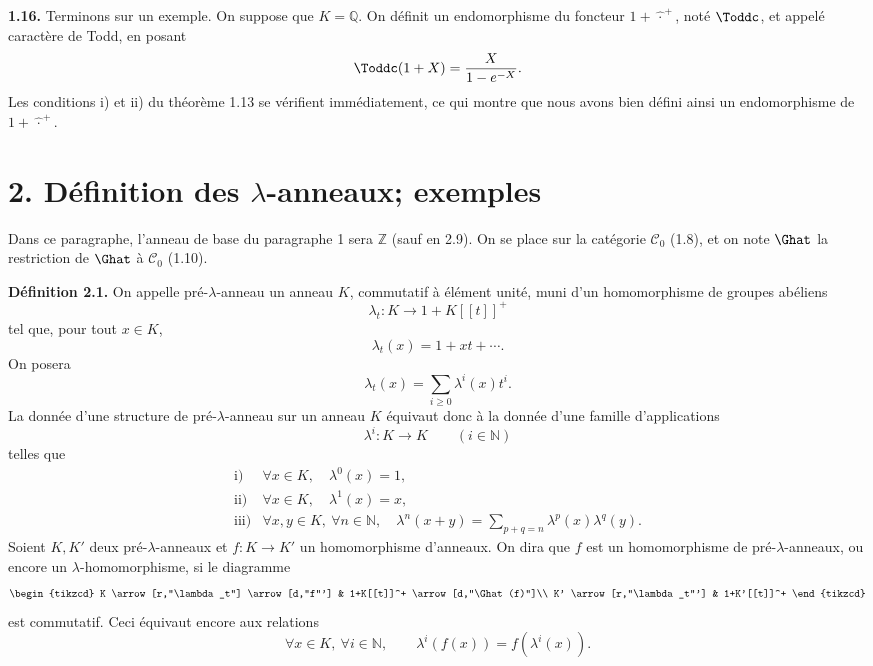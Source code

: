 \documentclass[11pt]{article}
\begin{document}
\textbf{1.16.} Terminons sur un exemple. On suppose que \(K=\mathbb Q\). On définit un endomorphisme du foncteur \(1+\widehat{\,\cdot\,}^{+}\), noté \(\Toddc\), et appelé caractère de Todd, en posant
\[
  \Toddc(1+X)=\frac{X}{1-e^{-X}}.
\]
Les conditions i) et ii) du théorème 1.13 se vérifient immédiatement, ce qui montre que nous avons bien défini ainsi un endomorphisme de \(1+\widehat{\,\cdot\,}^{+}\).

\section*{2. Définition des \(\lambda\)-anneaux; exemples}

Dans ce paragraphe, l'anneau de base du paragraphe 1 sera \(\mathbb Z\) (sauf en 2.9). On se place sur la catégorie \(\mathcal C_0\) (1.8), et on note \(\Ghat\) la restriction de \(\Ghat\) à \(\mathcal C_0\) (1.10).

\textbf{Définition 2.1.} On appelle pré-\(\lambda\)-anneau un anneau \(K\), commutatif à élément unité, muni d'un homomorphisme de groupes abéliens
\[
  \lambda_t:K\longrightarrow1+K[[t]]^+
\]
tel que, pour tout \(x\in K\),
\[
  \lambda_t(x)=1+xt+\cdots.
\]
On posera
\[
  \lambda_t(x)=\sum_{i\geq0}\lambda^i(x)t^i.
\]
La donnée d'une structure de pré-\(\lambda\)-anneau sur un anneau \(K\) équivaut donc à la donnée d'une famille d'applications
\[
  \lambda^i:K\longrightarrow K\qquad (i\in\mathbb N)
\]
telles que
\[
\begin{array}{ll}
\text{i)}& \forall x\in K,\quad \lambda^0(x)=1,\\[0.3em]
\text{ii)}& \forall x\in K,\quad \lambda^1(x)=x,\\[0.3em]
\text{iii)}& \forall x,y\in K,\ \forall n\in\mathbb N,\quad
\lambda^n(x+y)=\displaystyle\sum_{p+q=n}\lambda^p(x)\lambda^q(y).
\end{array}
\]
Soient \(K,K'\) deux pré-\(\lambda\)-anneaux et \(f:K\to K'\) un homomorphisme d'anneaux. On dira que \(f\) est un homomorphisme de pré-\(\lambda\)-anneaux, ou encore un \(\lambda\)-homomorphisme, si le diagramme
\[
\begin{tikzcd}
K \arrow[r,"\lambda_t"] \arrow[d,"f"'] &
1+K[[t]]^+ \arrow[d,"\Ghat(f)"]\\
K' \arrow[r,"\lambda_t"'] &
1+K'[[t]]^+
\end{tikzcd}
\]
est commutatif. Ceci équivaut encore aux relations
\[
  \forall x\in K,\ \forall i\in\mathbb N,\qquad
  \lambda^i(f(x))=f(\lambda^i(x)).
\]
\end{document}
